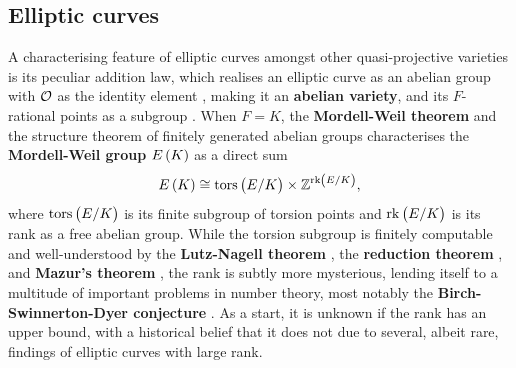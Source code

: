 \subsection{Elliptic curves}

A characterising feature of elliptic curves amongst other quasi-projective varieties is its peculiar addition law, which realises an elliptic curve as an abelian group with $ \mathcal{O} $ as the identity element \cite[Algorithm III.2.3]{Sil09}, making it an \textbf{abelian variety}, and its $ F $-rational points as a subgroup \cite[Proposition III.2.2(f)]{Sil09}. When $ F = K $, the \textbf{Mordell-Weil theorem} and the structure theorem of finitely generated abelian groups characterises the \textbf{Mordell-Weil group} $ E\br{K} $ as a direct sum \cite[Theorem VIII.6.7]{Sil09}
$$ E\br{K} \cong \torsE \times \ZZ^{\rkE}, $$
where $ \torsE $ is its finite subgroup of torsion points and $ \rkE $ is its rank as a free abelian group. While the torsion subgroup is finitely computable and well-understood by the \textbf{Lutz-Nagell theorem} \cite[Corollary VIII.7.2]{Sil09}, the \textbf{reduction theorem} \cite[Application VII.3.2]{Sil09}, and \textbf{Mazur's theorem} \cite[Theorem VIII.7.5]{Sil09}, the rank is subtly more mysterious, lending itself to a multitude of important problems in number theory, most notably the \textbf{Birch-Swinnerton-Dyer conjecture} \cite[Conjecture C.16.5]{Sil09}. As a start, it is unknown if the rank has an upper bound, with a historical belief that it does not \cite[Conjecture VIII.10.1]{Sil09} due to several, albeit rare, findings of elliptic curves with large rank.

